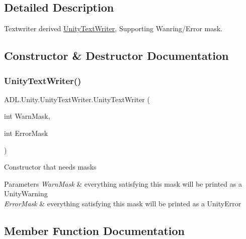 \subsection{Detailed Description}
Textwriter derived \mbox{\hyperlink{class_a_d_l_1_1_unity_1_1_unity_text_writer}{Unity\+Text\+Writer}}, Supporting Wanring/\+Error mask. 



\subsection{Constructor \& Destructor Documentation}
\mbox{\label{class_a_d_l_1_1_unity_1_1_unity_text_writer_ad037515e513a7f4c94d4cb2caf58b422}} 
\subsubsection{\texorpdfstring{Unity\+Text\+Writer()}{UnityTextWriter()}}
{\footnotesize\ttfamily A\+D\+L.\+Unity.\+Unity\+Text\+Writer.\+Unity\+Text\+Writer (\begin{DoxyParamCaption}\item[{int}]{Warn\+Mask,  }\item[{int}]{Error\+Mask }\end{DoxyParamCaption})}



Constructor that needs masks 


\begin{DoxyParams}{Parameters}
{\em Warn\+Mask} & everything satisfying this mask will be printed as a Unity\+Warning\\
\hline
{\em Error\+Mask} & everything satisfying this mask will be printed as a Unity\+Error\\
\hline
\end{DoxyParams}


\subsection{Member Function Documentation}
\mbox{\label{class_a_d_l_1_1_unity_1_1_unity_text_writer_ad62666e8a12f473f34780dbfdbc71975}} 
